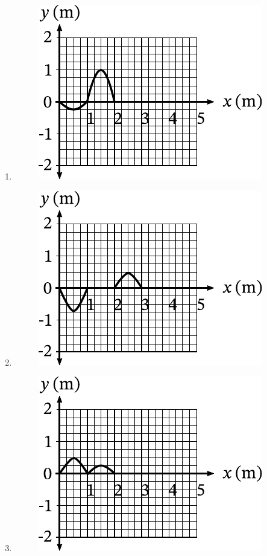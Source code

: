 \documentclass[a4paper, 12pt]{article}
\begin{document}
\begin{enumerate}
\begin{enumerate}
\begin{figure}[H]
                    \end{figure}
              \item \hfill
                    \begin{figure}[H]
                        \includegraphics{images/21_9_2.pdf}
                    \end{figure}
                    \vfill
              \item \hfill
                    \begin{figure}[H]
                        \includegraphics{images/21_9_3.pdf}
                    \end{figure}
              \item \hfill
                    \begin{figure}[H]
                        \includegraphics{images/21_9_4.pdf}

\end{figure}
\end{enumerate}
\end{enumerate}
\end{document}
